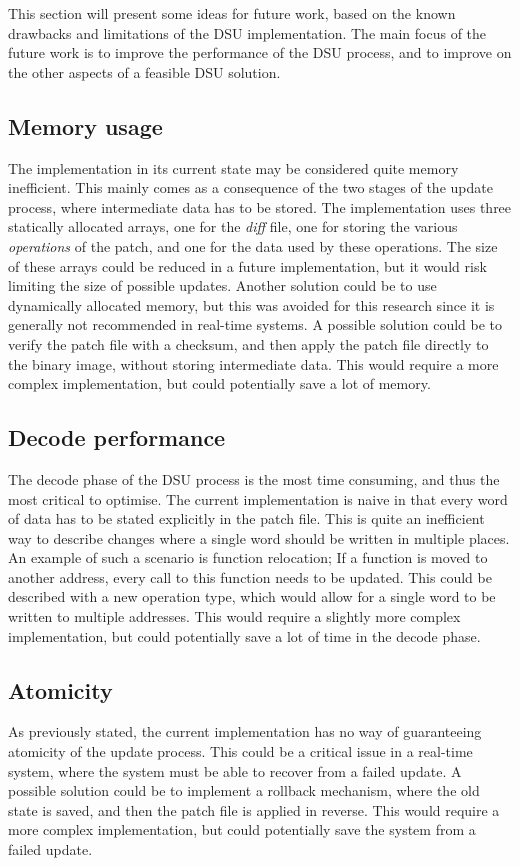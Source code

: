 This section will present some ideas for future work, based on the known drawbacks and limitations of the DSU implementation. The main focus of the future work is to improve the performance of the DSU process, and to improve on the other aspects of a feasible DSU solution.
\subsection*{Memory usage}
The implementation in its current state may be considered quite memory inefficient. This mainly comes as a consequence of the two stages of the update process, where intermediate data has to be stored. The implementation uses three statically allocated arrays, one for the \textit{diff} file, one for storing the various \textit{operations} of the patch, and one for the data used by these operations. The size of these arrays could be reduced in a future implementation, but it would risk limiting the size of possible updates. Another solution could be to use dynamically allocated memory, but this was avoided for this research since it is generally not recommended in real-time systems. A possible solution could be to verify the patch file with a checksum, and then apply the patch file directly to the binary image, without storing intermediate data. This would require a more complex implementation, but could potentially save a lot of memory.

\subsection*{Decode performance}
The decode phase of the DSU process is the most time consuming, and thus the most critical to optimise. The current implementation is naive in that every word of data has to be stated explicitly in the patch file. This is quite an inefficient way to describe changes where a single word should be written in multiple places. An example of such a scenario is function relocation; If a function is moved to another address, every call to this function needs to be updated. This could be described with a new operation type, which would allow for a single word to be written to multiple addresses. This would require a slightly more complex implementation, but could potentially save a lot of time in the decode phase. 

\subsection*{Atomicity}
As previously stated, the current implementation has no way of guaranteeing atomicity of the update process. This could be a critical issue in a real-time system, where the system must be able to recover from a failed update. A possible solution could be to implement a rollback mechanism, where the old state is saved, and then the patch file is applied in reverse. This would require a more complex implementation, but could potentially save the system from a failed update.
